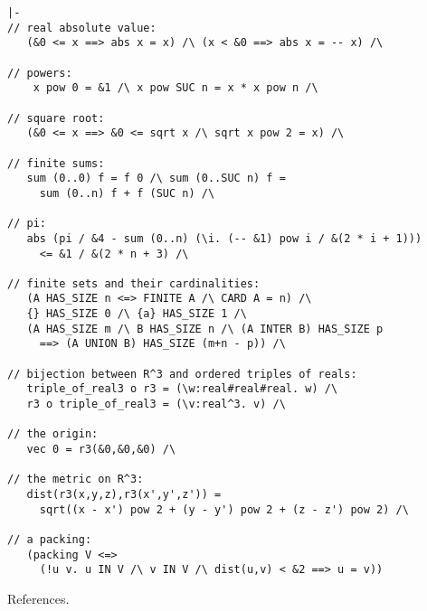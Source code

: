 \begin{obeylines}

\begin{verbatim}
|-  
// real absolute value:
   (&0 <= x ==> abs x = x) /\ (x < &0 ==> abs x = -- x) /\   

// powers:
    x pow 0 = &1 /\ x pow SUC n = x * x pow n /\

// square root:
   (&0 <= x ==> &0 <= sqrt x /\ sqrt x pow 2 = x) /\ 

// finite sums:
   sum (0..0) f = f 0 /\ sum (0..SUC n) f =  
     sum (0..n) f + f (SUC n) /\ 

// pi:
   abs (pi / &4 - sum (0..n) (\i. (-- &1) pow i / &(2 * i + 1))) 
     <= &1 / &(2 * n + 3) /\

// finite sets and their cardinalities:
   (A HAS_SIZE n <=> FINITE A /\ CARD A = n) /\
   {} HAS_SIZE 0 /\ {a} HAS_SIZE 1 /\ 
   (A HAS_SIZE m /\ B HAS_SIZE n /\ (A INTER B) HAS_SIZE p 
     ==> (A UNION B) HAS_SIZE (m+n - p)) /\

// bijection between R^3 and ordered triples of reals:
   triple_of_real3 o r3 = (\w:real#real#real. w) /\
   r3 o triple_of_real3 = (\v:real^3. v) /\ 

// the origin:
   vec 0 = r3(&0,&0,&0) /\

// the metric on R^3:
   dist(r3(x,y,z),r3(x',y',z')) = 
     sqrt((x - x') pow 2 + (y - y') pow 2 + (z - z') pow 2) /\

// a packing:
   (packing V <=> 
     (!u v. u IN V /\ v IN V /\ dist(u,v) < &2 ==> u = v))
\end{verbatim}

\end{obeylines}



References.
